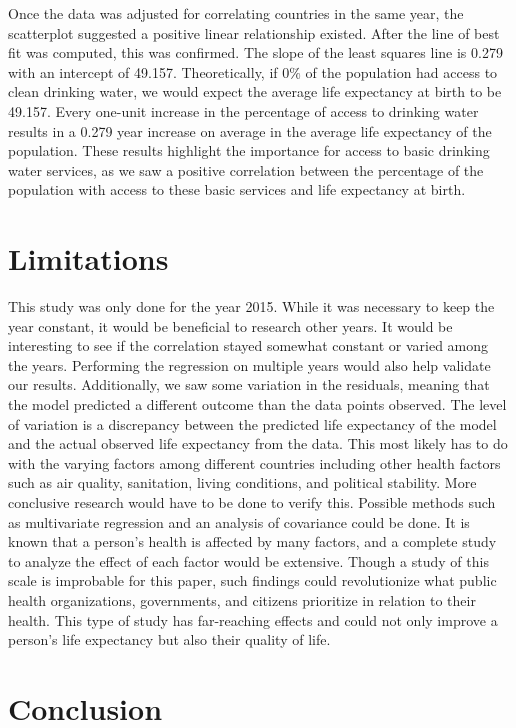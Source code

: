 \documentclass[12pt]{article}
\begin{document}
Once the data was adjusted for correlating countries in the same year, the scatterplot suggested a positive linear relationship existed. After the line of best fit was computed, this was confirmed. The slope of the least squares line is 0.279 with an intercept of 49.157. Theoretically, if $0\%$ of the population had access to clean drinking water, we would expect the average life expectancy at birth to be 49.157. Every one-unit increase in the percentage of access to drinking water results in a 0.279 year increase on average in the average life expectancy of the population. These results highlight the importance for access to basic drinking water services, as we saw a positive correlation between the percentage of the population with access to these basic services and life expectancy at birth.

\section{Limitations}

This study was only done for the year 2015. While it was necessary to keep the year constant, it would be beneficial to research other years. It would be interesting to see if the correlation stayed somewhat constant or varied among the years. Performing the regression on multiple years would also help validate our results. Additionally, we saw some variation in the residuals, meaning that the model predicted a different outcome than the data points observed. The level of variation is a discrepancy between the predicted life expectancy of the model and the actual observed life expectancy from the data. This most likely has to do with the varying factors among different countries including other health factors such as air quality, sanitation, living conditions, and political stability. More conclusive research would have to be done to verify this. Possible methods such as multivariate regression and an analysis of covariance could be done. It is known that a person's health is affected by many factors, and a complete study to analyze the effect of each factor would be extensive. Though a study of this scale is improbable for this paper, such findings could revolutionize what public health organizations, governments, and citizens prioritize in relation to their health. This type of study has far-reaching effects and could not only improve a person's life expectancy but also their quality of life.

\section{Conclusion}
\end{document}
